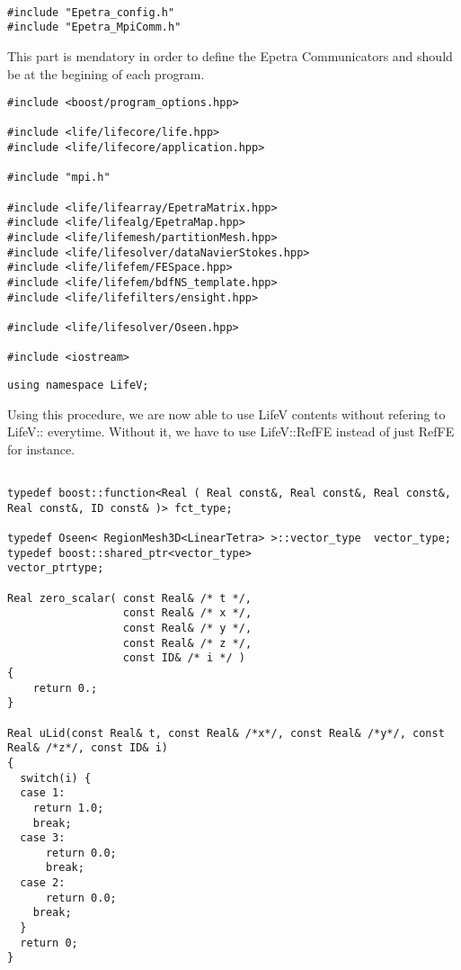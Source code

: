 %
%
%
%
%


\begin{verbatim}

#include "Epetra_config.h"
#include "Epetra_MpiComm.h"

\end{verbatim}

This part is mendatory in order to define the Epetra Communicators and should be
at the begining of each program.


\begin{verbatim}
#include <boost/program_options.hpp>

#include <life/lifecore/life.hpp>
#include <life/lifecore/application.hpp>

#include "mpi.h"

#include <life/lifearray/EpetraMatrix.hpp>
#include <life/lifealg/EpetraMap.hpp>
#include <life/lifemesh/partitionMesh.hpp>
#include <life/lifesolver/dataNavierStokes.hpp>
#include <life/lifefem/FESpace.hpp>
#include <life/lifefem/bdfNS_template.hpp>
#include <life/lifefilters/ensight.hpp>

#include <life/lifesolver/Oseen.hpp>

#include <iostream>
\end{verbatim}



\begin{verbatim}
using namespace LifeV;
\end{verbatim}

Using this procedure, we are now able to use LifeV contents without refering to LifeV:: everytime.
Without it, we have to use LifeV::RefFE instead of just RefFE for instance.


\begin{verbatim}

typedef boost::function<Real ( Real const&, Real const&, Real const&, Real const&, ID const& )> fct_type;

typedef Oseen< RegionMesh3D<LinearTetra> >::vector_type  vector_type;
typedef boost::shared_ptr<vector_type>                   vector_ptrtype;

Real zero_scalar( const Real& /* t */,
                  const Real& /* x */,
                  const Real& /* y */,
                  const Real& /* z */,
                  const ID& /* i */ )
{
    return 0.;
}

Real uLid(const Real& t, const Real& /*x*/, const Real& /*y*/, const Real& /*z*/, const ID& i)
{
  switch(i) {
  case 1:
    return 1.0;
    break;
  case 3:
      return 0.0;
      break;
  case 2:
      return 0.0;
    break;
  }
  return 0;
}

\end{verbatim}

